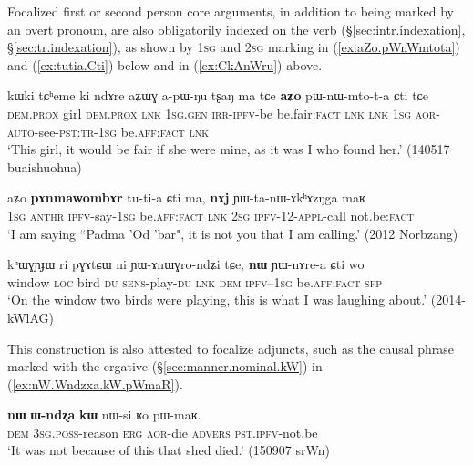 Focalized first or second person core arguments, in addition to being marked by an overt pronoun, are also obligatorily indexed on the verb (§\ref{sec:intr.indexation}, §\ref{sec:tr.indexation}), as shown by \textsc{1sg} and \textsc{2sg} marking in (\ref{ex:aZo.pWnWmtota}) and (\ref{ex:tutia.Cti}) below and in (\ref{ex:CkAnWru}) above.

\begin{exe}
\ex \label{ex:aZo.pWnWmtota}
\gll  kɯki tɕʰeme ki ndɤre aʑɯɣ a-pɯ-ŋu tʂaŋ ma tɕe \textbf{aʑo} pɯ-nɯ-mto-t-a ɕti tɕe \\
\textsc{dem}.\textsc{prox} girl  \textsc{dem}.\textsc{prox} \textsc{lnk} \textsc{1sg}.\textsc{gen} \textsc{irr}-\textsc{ipfv}-be be.fair:\textsc{fact} \textsc{lnk} \textsc{lnk} \textsc{1sg} \textsc{aor}-\textsc{auto}-see-\textsc{pst}:\textsc{tr}-\textsc{1sg} be.\textsc{aff}:\textsc{fact} \textsc{lnk} \\
\glt `This girl, it would be fair if she were mine, as it was I who found her.' (140517 buaishuohua)
\end{exe}

\begin{exe}
\ex \label{ex:tutia.Cti}
\gll aʑo \textbf{pɤnmawombɤr} tu-ti-a ɕti ma, \textbf{nɤj} ɲɯ-ta-nɯ-ɤkʰɤzŋga maʁ  \\
\textsc{1sg}  \textsc{anthr} \textsc{ipfv}-say-\textsc{1sg} be.\textsc{aff}:\textsc{fact} \textsc{lnk} \textsc{2sg} \textsc{ipfv}-1\fl{}2-\textsc{appl}-call not.be:\textsc{fact} \\
\glt `I am saying ``Padma 'Od 'bar", it is not you that I am calling.' (2012 Norbzang)
\end{exe}

 \begin{exe}
\ex \label{ex:nW.YWnArea}
\gll  kʰɯɣɲɟɯ ri pɣɤtɕɯ ni ɲɯ-ɤnɯɣro-ndʑi tɕe, \textbf{nɯ} ɲɯ-nɤre-a ɕti wo  \\
window \textsc{loc} bird \textsc{du} \textsc{sens}-play-\textsc{du} \textsc{lnk} \textsc{dem} \textsc{ipfv}--\textsc{1sg}  be.\textsc{aff}:\textsc{fact} \textsc{sfp} \\
\glt `On the window two birds were playing, this is what I was laughing about.' (2014-kWlAG)
\end{exe}

This construction is also attested to focalize adjuncts, such as the causal phrase marked with the ergative (§\ref{sec:manner.nominal.kW}) in (\ref{ex:nW.Wndzxa.kW.pWmaR}).

\begin{exe}
\ex \label{ex:nW.Wndzxa.kW.pWmaR}
\gll  \textbf{nɯ} \textbf{ɯ-ndʐa} \textbf{kɯ} nɯ-si ʁo pɯ-maʁ. \\
\textsc{dem} \textsc{3sg}.\textsc{poss}-reason \textsc{erg} \textsc{aor}-die \textsc{advers} \textsc{pst}.\textsc{ipfv}-not.be \\
\glt `It was not because of this that shed died.' (150907 srWn)
\end{exe}


